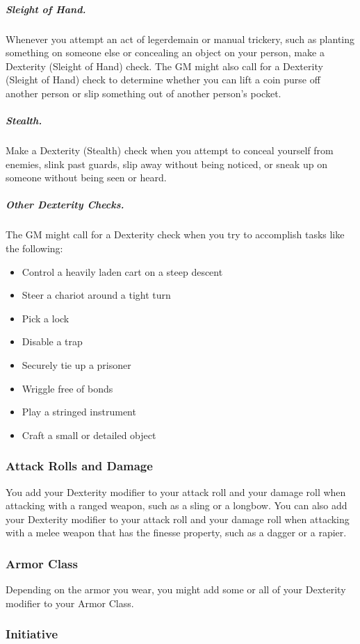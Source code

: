 \subparagraph*{Sleight of Hand.} Whenever you attempt an act of legerdemain or manual trickery, such as planting something on someone else or concealing an object on your person, make a Dexterity (Sleight of Hand) check. The GM might also call for a Dexterity (Sleight of Hand) check to determine whether you can lift a coin purse off another person or slip something out of another person's pocket.

\subparagraph*{Stealth.} Make a Dexterity (Stealth) check when you attempt to conceal yourself from enemies, slink past guards, slip away without being noticed, or sneak up on someone without being seen or heard.

\subparagraph*{Other Dexterity Checks.} The GM might call for a Dexterity check when you try to accomplish tasks like the following:

\begin{itemize}
\item Control a heavily laden cart on a steep descent
\item Steer a chariot around a tight turn
\item Pick a lock
\item Disable a trap
\item Securely tie up a prisoner
\item Wriggle free of bonds
\item Play a stringed instrument
\item Craft a small or detailed object
\end{itemize}

\subsubsection{Attack Rolls and Damage}

You add your Dexterity modifier to your attack roll and your damage roll when attacking with a ranged weapon, such as a sling or a longbow. You can also add your Dexterity modifier to your attack roll and your damage roll when attacking with a melee weapon that has the finesse property, such as a dagger or a rapier.

\subsubsection{Armor Class}

Depending on the armor you wear, you might add some or all of your Dexterity modifier to your Armor Class.

\subsubsection{Initiative}


